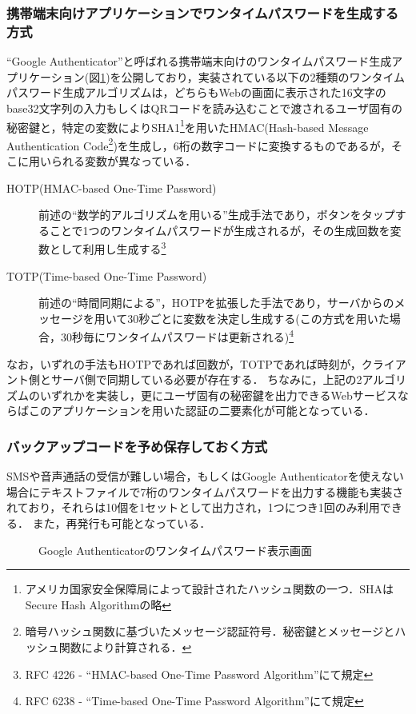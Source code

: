\subsubsection{携帯端末向けアプリケーションでワンタイムパスワードを生成する方式}
``Google Authenticator''と呼ばれる携帯端末向けのワンタイムパスワード生成アプリケーション(図\ref{fig:googleAuthenticator})を公開しており，実装されている以下の2種類のワンタイムパスワード生成アルゴリズムは，どちらもWebの画面に表示された16文字のbase32文字列の入力もしくはQRコードを読み込むことで渡されるユーザ固有の秘密鍵と，特定の変数によりSHA1\footnote{アメリカ国家安全保障局によって設計されたハッシュ関数の一つ．SHAはSecure Hash Algorithmの略}を用いたHMAC(Hash-based Message Authentication Code\footnote{暗号ハッシュ関数に基づいたメッセージ認証符号．秘密鍵とメッセージとハッシュ関数により計算される．})を生成し，6桁の数字コードに変換するものであるが，そこに用いられる変数が異なっている．
\begin{description}
  \item[HOTP(HMAC-based One-Time Password)] 前述の``数学的アルゴリズムを用いる''生成手法であり，ボタンをタップすることで1つのワンタイムパスワードが生成されるが，その生成回数を変数として利用し生成する\footnote{RFC 4226 - ``HMAC-based One-Time Password Algorithm''にて規定}
  \item[TOTP(Time-based One-Time Password)] 前述の``時間同期による''，HOTPを拡張した手法であり，サーバからのメッセージを用いて30秒ごとに変数を決定し生成する(この方式を用いた場合，30秒毎にワンタイムパスワードは更新される)\footnote{RFC 6238 - ``Time-based One-Time Password Algorithm''にて規定}
\end{description}
なお，いずれの手法もHOTPであれば回数が，TOTPであれば時刻が，クライアント側とサーバ側で同期している必要が存在する．
ちなみに，上記の2アルゴリズムのいずれかを実装し，更にユーザ固有の秘密鍵を出力できるWebサービスならばこのアプリケーションを用いた認証の二要素化が可能となっている．

\subsubsection{バックアップコードを予め保存しておく方式}
SMSや音声通話の受信が難しい場合，もしくはGoogle Authenticatorを使えない場合にテキストファイルで7桁のワンタイムパスワードを出力する機能も実装されており，それらは10個を1セットとして出力され，1つにつき1回のみ利用できる．
また，再発行も可能となっている．

\begin{figure}[ht]
  \begin{center}
  \end{center}
  \caption{Google Authenticatorのワンタイムパスワード表示画面}
  \label{fig:googleAuthenticator}
\end{figure}

